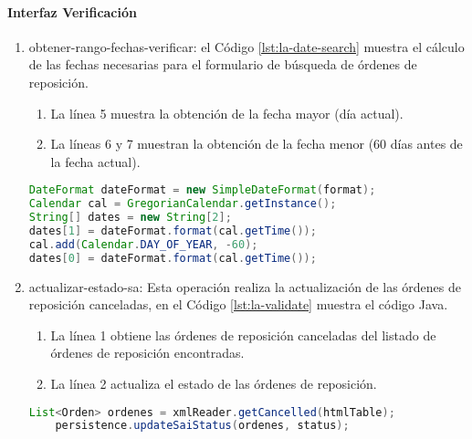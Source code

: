 \paragraph{\indent Interfaz Verificación}
\begin{enumerate}
	\item obtener-rango-fechas-verificar: el Código \ref{lst:la-date-search} muestra el cálculo de las fechas necesarias para el formulario de búsqueda de órdenes de reposición.
	\begin{enumerate}
		\item La línea 5 muestra la obtención de la fecha mayor (día actual).
		\item La líneas 6 y 7 muestran la obtención de la fecha menor (60 días antes de la fecha actual).
	\end{enumerate}
	\begin{lstlisting}[language=Java, caption={Cálculo del rango de fechas para buscar órdenes de reposición canceladas.}, captionpos=b, label={lst:la-date-search}]
DateFormat dateFormat = new SimpleDateFormat(format);
Calendar cal = GregorianCalendar.getInstance();
String[] dates = new String[2];
dates[1] = dateFormat.format(cal.getTime());
cal.add(Calendar.DAY_OF_YEAR, -60);
dates[0] = dateFormat.format(cal.getTime());
	\end{lstlisting}

	\item actualizar-estado-sa: Esta operación realiza la actualización de las órdenes de reposición canceladas, en el Código \ref{lst:la-validate} muestra el código Java.
	\begin{enumerate}
		\item La línea 1 obtiene las órdenes de reposición canceladas del listado de órdenes de reposición encontradas.
		\item La línea 2 actualiza el estado de las órdenes de reposición.
	\end{enumerate}
	\begin{lstlisting}[language=Java, caption={Actualización de órdenes de reposición canceladas.}, captionpos=b, label={lst:la-validate}]
	List<Orden> ordenes = xmlReader.getCancelled(htmlTable);
	persistence.updateSaiStatus(ordenes, status);
	\end{lstlisting}
\end{enumerate}
